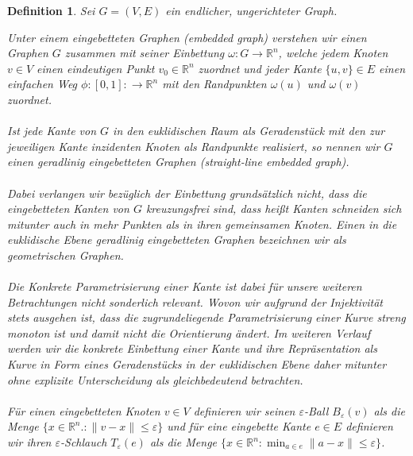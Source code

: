 \documentclass[a4paper, 12pt, twoside]{article}
\theoremstyle{Format1} %
\newtheorem{Def}{Definition}[section]       %
\begin{document}
\begin{Def}
	Sei $G=(V,E)$ ein endlicher, ungerichteter Graph.

	Unter einem \textit{eingebetteten Graphen (embedded graph)} verstehen wir einen Graphen $G$
	zusammen mit seiner \textit{Einbettung} $\omega: G \to \mathbb{R}^n$, welche
	jedem Knoten $v \in V$ einen eindeutigen Punkt $v_0 \in \mathbb{R}^n$ zuordnet und jeder Kante $\{u,v\} \in E$
	einen einfachen Weg $\phi: [0,1]: \to \mathbb{R}^n$ mit den Randpunkten $\omega(u)$ und $\omega(v)$ zuordnet.
	\\
	\\
	Ist jede Kante von $G$ in den euklidischen Raum als Geradenstück mit den zur jeweiligen Kante inzidenten Knoten als Randpunkte realisiert, so
	nennen wir $G$ einen \textit{geradlinig eingebetteten Graphen (straight-line embedded graph)}.
	\\
	\\
	Dabei verlangen wir bezüglich der Einbettung grundsätzlich nicht, dass die eingebetteten Kanten von $G$ \textit{kreuzungsfrei} sind,
	dass heißt Kanten schneiden sich mitunter auch in mehr Punkten als in ihren gemeinsamen Knoten.
	Einen in die euklidische Ebene geradlinig eingebetteten Graphen bezeichnen wir als \textit{geometrischen Graphen}.
	\\
	\\
	Die Konkrete Parametrisierung einer Kante ist dabei für unsere weiteren Betrachtungen nicht sonderlich relevant.
	Wovon wir aufgrund der Injektivität stets ausgehen ist, dass die zugrundeliegende Parametrisierung einer Kurve streng monoton ist und damit nicht die Orientierung ändert.
	Im weiteren Verlauf werden wir die konkrete Einbettung einer Kante und ihre Repräsentation als Kurve in Form eines Geradenstücks in der euklidischen
	Ebene daher mitunter ohne explizite Unterscheidung als gleichbedeutend betrachten.
	\\
	\\
	Für einen eingebetteten Knoten $v \in V$ definieren wir seinen \textit{$\varepsilon$-Ball} $B_{\varepsilon}(v)$ als die Menge
	$\{x \in \mathbb{R}^n.: \|v-x\| \leq \varepsilon\}$
	und für eine eingebette Kante $e \in E$ definieren wir ihren \textit{$\varepsilon$-Schlauch} $T_{\varepsilon}(e)$ als die Menge
	$\{x \in \mathbb{R}^n: \min_{a \in e}\|a-x\| \leq \varepsilon\}$.
\end{Def}
\end{document}
